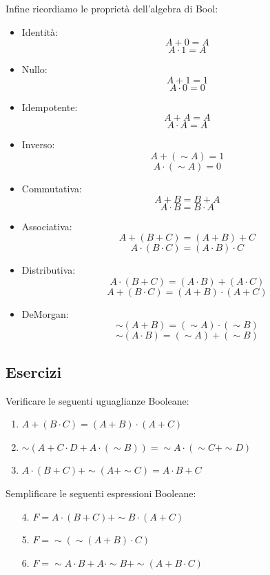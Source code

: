 \documentclass[tikz, border=2mm]{article}
\begin{document}
\newpage

\noindent Infine ricordiamo le propriet\`a dell'algebra di Bool:
\begin{itemize}
    \item Identità: $$A+0=A$$ $$A\cdot1=A$$
    \item Nullo: $$A+1=1$$ $$A\cdot0=0$$
    \item Idempotente:  $$A+A=A$$  $$A\cdot A=A$$
    \item Inverso:  $$A+(\sim A)=1$$ $$ A\cdot(\sim A)=0$$
    \item Commutativa:  $$A+B=B+A$$  $$A\cdot B=B\cdot A$$
    \item Associativa: $$ A+(B+C)=(A+B)+C$$  $$A\cdot(B\cdot C)=(A\cdot B)\cdot C$$
    \item Distributiva:  $$A\cdot (B+C)=(A\cdot B)+(A\cdot C)$$  $$A+(B\cdot C)=(A+B)\cdot (A+C)$$
    \item DeMorgan:  $$\sim (A+B)=(\sim A)\cdot (\sim B)$$ $$\sim (A\cdot B)=(\sim A)+(\sim B)$$
\end{itemize}

\subsection{Esercizi}
Verificare le seguenti uguaglianze Booleane:
\begin{enumerate}
    \item $A+(B\cdot C)=(A+B)\cdot (A+C)$
    \item $\sim  (A+C\cdot D+A\cdot (\sim  B))=\sim  A\cdot (\sim  C+\sim  D)$
    \item $A\cdot (B+C)+\sim  (A+\sim  C)=A\cdot B+C$
\end{enumerate}

\noindent Semplificare le seguenti espressioni Booleane:
\begin{enumerate}
    \item[4.] $F=A\cdot (B+C)+\sim  B\cdot (A+C)$
    \item[5.] $F=\sim  (\sim  (A+B)\cdot C)$
    \item[6.] $F=\sim  A\cdot B+A\cdot \sim B+\sim  (A+B\cdot C)$
\end{enumerate}
\end{document}
